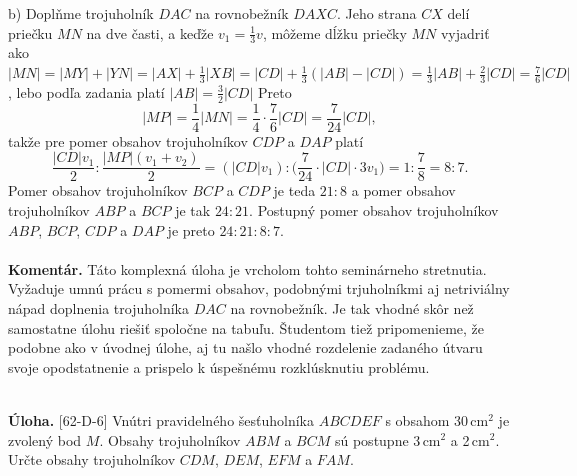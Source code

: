 \documentclass[11pt,a4paper,oneside,final]{book}
\newcommand{\kom}{\textbf{Komentár.} }
\newcommand{\ul}{\textbf{Úloha.} }
\begin{document}
b) Doplňme trojuholník $DAC$ na rovnobežník $DAXC$. Jeho strana $CX$ delí priečku $MN$ na dve časti, a keďže $v_1 =\frac{1}{3}v$, môžeme dĺžku priečky $MN$ vyjadriť ako $|MN| = |MY | + |Y N| = |AX| +\frac{1}{3} |XB| = |CD| +\frac{1}{3} (|AB| - |CD|) = \frac{1}{3}|AB| +\frac{2}{3}|CD| = \frac{7}{6}|CD|$, lebo podľa zadania platí $|AB| =\frac{3}{2}|CD|$ Preto
$$|MP| =\frac{1}{4}|MN| =\frac{1}{4} \cdot \frac{7}{6}|CD| = \frac{7}{24}|CD|,$$
takže pre pomer obsahov trojuholníkov $CDP$ a $DAP$ platí
$$ \frac{|CD|v_1}{2}:\frac{|MP|(v_1 + v_2 )}{2}= (|CD|v_1 ) : \bigg( \frac{7}{24}\cdot |CD| \cdot 3v_1\bigg)= 1 :\frac{7}{8} = 8 : 7.$$
Pomer obsahov trojuholníkov $BCP$ a $CDP$ je teda $21 : 8$ a pomer obsahov trojuholníkov $ABP$ a $BCP$ je tak $24 : 21$. Postupný pomer obsahov trojuholníkov $ABP$, $BCP$, $CDP$ a $DAP$ je preto $24 : 21 : 8 : 7$.\\
\\
\kom Táto komplexná úloha je vrcholom tohto seminárneho stretnutia. Vyžaduje umnú prácu s pomermi obsahov, podobnými trjuholníkmi aj netriviálny nápad doplnenia trojuholníka $DAC$ na rovnobežník. Je tak vhodné skôr než samostatne úlohu riešiť spoločne na tabuľu. Študentom tiež pripomenieme, že podobne ako v úvodnej úlohe, aj tu našlo vhodné rozdelenie zadaného útvaru svoje opodstatnenie a prispelo k úspešnému rozklúsknutiu problému. \\
\\
\begin{tcolorbox}[breakable,notitle,boxrule=0pt,colback=light-gray,colframe=light-gray]\ul [62-D-6] Vnútri pravidelného šesťuholníka $ABCDEF$ s obsahom 30\,cm$^2$ je zvolený bod $M$. Obsahy trojuholníkov $ABM$ a $BCM$ sú postupne 3\,cm$^2$ a 2\,cm$^2$. Určte obsahy trojuholníkov $CDM$, $DEM$, $EFM$ a $FAM$.

\end{tcolorbox}
\end{document}
